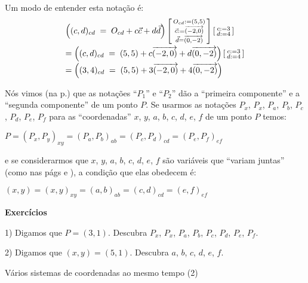 \documentclass[oneside]{book}
\begin{document}
\bsk

Um modo de entender esta notação é:
%
$$\begin{array}{ll}
  \left( (c,d)_{cd} \; = \; O_{cd} + c\cc + d\dd \right)
    \subst{ O_{cd}:=(5,5) \\ \cc:=\V(-2,0) \\ \dd=\V(0,-2) \\ }
    \subst{ c:=3 \\ d:=4 \\ }
  \\[12pt] =
  \left( (c,d)_{cd} \; = \; (5,5) + c\V(-2,0) + d\V(0,-2) \right)
    \subst{ c:=3 \\ d:=4 \\ }
  \\[5pt] =
  \left( (3,4)_{cd} \; = \; (5,5) + 3\V(-2,0) + 4\V(0,-2) \right)
  \end{array}
$$

Nós vimos (na p.\pageref{pontos-e-vetores}) que as notações ``$P_1$''
e ``$P_2$'' dão a ``primeira componente'' e a ``segunda componente''
de um ponto $P$. Se usarmos as notações $P_x$, $P_x$, $P_a$, $P_b$,
$P_c$, $P_d$, $P_e$, $P_f$ para as ``coordenadas'' $x$, $y$, $a$, $b$,
$c$, $d$, $e$, $f$ de um ponto $P$ temos:

\ssk

$P = (P_x,P_y)_{xy} = (P_a,P_b)_{ab} = (P_c,P_d)_{cd} = (P_e,P_f)_{ef}$

\ssk

\noindent e se considerarmos que $x$, $y$, $a$, $b$, $c$, $d$, $e$,
$f$ são variáveis que ``variam juntas'' (como nas págs
\pageref{sistemas} e \pageref{sistemas-2}), a condição que elas
obedecem é:

\ssk

$(x,y) = (x,y)_{xy} = (a,b)_{ab} = (c,d)_{cd} = (e,f)_{ef}$

\ssk

{\bf Exercícios}

1) Digamos que $P=(3,1)$. Descubra $P_x$, $P_x$, $P_a$, $P_b$, $P_c$,
$P_d$, $P_e$, $P_f$.

2) Digamos que $(x,y)=(5,1)$. Descubra $a$, $b$, $c$, $d$, $e$, $f$.


\newpage



%                                                                       
 {Vários sistemas de coordenadas ao mesmo tempo (2)}
\end{document}
